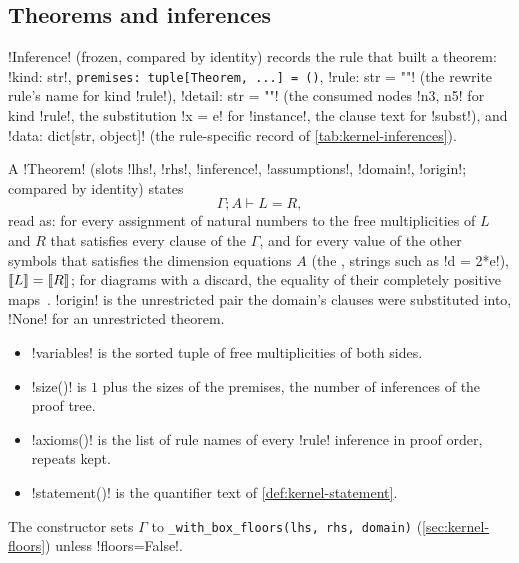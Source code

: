 \subsection{Theorems and inferences}

\begin{definition}[Inference]\label{def:kernel-inference}
\py!Inference! (frozen, compared by identity) records the rule that built a theorem: \py!kind: str!, \texttt{premises: tuple[Theorem,\allowbreak{} .\allowbreak{}.\allowbreak{}.\allowbreak{}] = (\allowbreak{})}, \py!rule: str = ""! (the rewrite rule's name for kind \code!rule!), \py!detail: str = ""! (the consumed nodes \code!n3, n5! for kind \code!rule!, the substitution \code!x = e! for \code!instance!, the clause text for \code!subst!), and \py!data: dict[str, object]! (the rule-specific record of \cref{tab:kernel-inferences}).
\end{definition}

\begin{definition}[Theorem]\label{def:kernel-theorem}
A \py!Theorem! (slots \code!lhs!, \code!rhs!, \code!inference!, \code!assumptions!, \code!domain!, \code!origin!; compared by identity) states
\[
\Gamma \mathrel{;} A \vdash L = R,
\]
read as: for every assignment of natural numbers to the free multiplicities of $L$ and $R$ that satisfies every clause of the  $\Gamma$, and for every value of the other symbols that satisfies the dimension equations $A$ (the , strings such as \code!d = 2*e!), $\llbracket L \rrbracket=\llbracket R \rrbracket$; for diagrams with a discard, the equality of their completely positive maps~\cite{selinger2007cpm}. \code!origin! is the unrestricted pair the domain's clauses were substituted into, \py!None! for an unrestricted theorem.
\begin{itemize}
\item \py!variables! is the sorted tuple of free multiplicities of both sides.
\item \py!size()! is $1$ plus the sizes of the premises, the number of inferences of the proof tree.
\item \py!axioms()! is the list of rule names of every \code!rule! inference in proof order, repeats kept.
\item \py!statement()! is the quantifier text of \cref{def:kernel-statement}.
\end{itemize}
The constructor sets $\Gamma$ to \texttt{\_\allowbreak{}with\_\allowbreak{}box\_\allowbreak{}floors(\allowbreak{}lhs,\allowbreak{} rhs,\allowbreak{} domain)} (\cref{sec:kernel-floors}) unless \code!floors=False!.
\end{definition}

